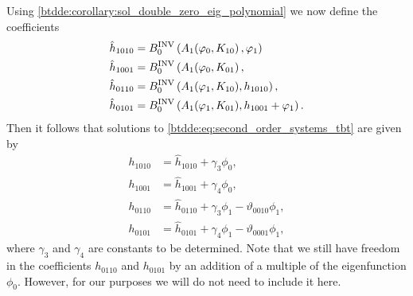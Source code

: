 Using \cref{btdde:corollary:sol_double_zero_eig_polynomial} we now define the coefficients
\begin{align}
    \hat h_{1010} & = B^{\mathrm{INV}}_{0} \left(A_1(\varphi_0,K_{10}\right),\varphi_1)\\
    \hat h_{1001} & = B^{\mathrm{INV}}_{0} \left(A_1(\varphi_0,K_{01}\right),\\
    \hat h_{0110} & = B^{\mathrm{INV}}_{0} \left(A_1(\varphi_1,K_{10}),h_{1010}\right),\\
    \hat h_{0101} & = B^{\mathrm{INV}}_{0} \left(A_1(\varphi_1,K_{01}),h_{1001} + \varphi_1\right).
\end{align}
Then it follows that solutions to \cref{btdde:eq:second_order_systems_tbt} are given by
\begin{equation}
\label{btdde:eq:seconder_order_coefficients_phase_space_tbt}
\begin{aligned}
    h_{1010} &= \hat h_{1010} + \gamma_3 \phi_0, \\
    h_{1001} &= \hat h_{1001} + \gamma_4 \phi_0, \\
    h_{0110} &= \hat h_{0110} + \gamma_3 \phi_1 - \vartheta_{0010} \phi_1, \\
    h_{0101} &= \hat h_{0101} + \gamma_4 \phi_1 - \vartheta_{0001} \phi_1,
\end{aligned}
\end{equation}
where $\gamma_3$ and $\gamma_4$ are constants to be determined. Note that we
still have freedom in the coefficients $h_{0110}$ and $h_{0101}$ by an addition of
a multiple of the eigenfunction $\phi_0$. However, for our purposes we will do
not need to include it here.


